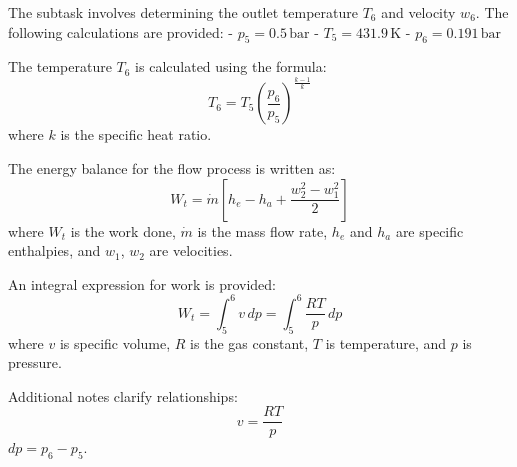 The subtask involves determining the outlet temperature \( T_6 \) and velocity \( w_6 \).  
The following calculations are provided:  
- \( p_5 = 0.5 \, \text{bar} \)  
- \( T_5 = 431.9 \, \text{K} \)  
- \( p_6 = 0.191 \, \text{bar} \)  

The temperature \( T_6 \) is calculated using the formula:  
\[
T_6 = T_5 \left( \frac{p_6}{p_5} \right)^{\frac{k-1}{k}}
\]  
where \( k \) is the specific heat ratio.  

The energy balance for the flow process is written as:  
\[
W_t = \dot{m} \left[ h_e - h_a + \frac{w_2^2 - w_1^2}{2} \right]
\]  
where \( W_t \) is the work done, \( \dot{m} \) is the mass flow rate, \( h_e \) and \( h_a \) are specific enthalpies, and \( w_1 \), \( w_2 \) are velocities.  

An integral expression for work is provided:  
\[
W_t = \int_5^6 v \, dp = \int_5^6 \frac{R T}{p} \, dp
\]  
where \( v \) is specific volume, \( R \) is the gas constant, \( T \) is temperature, and \( p \) is pressure.  

Additional notes clarify relationships:  
\[
v = \frac{RT}{p}
\]  
\( dp = p_6 - p_5 \).